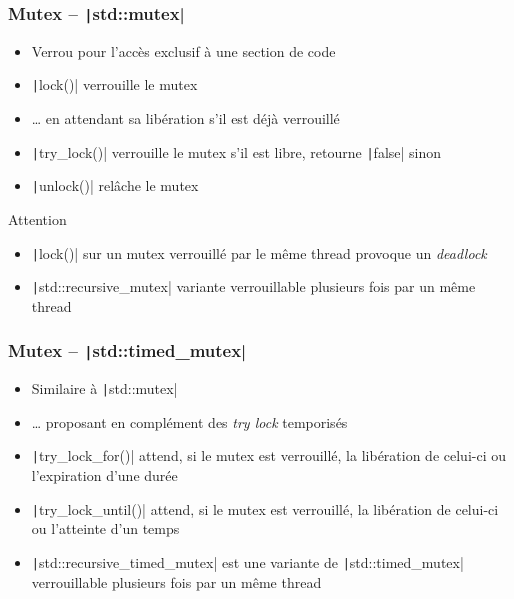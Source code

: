 \documentclass[C++.tex]{subfiles}
\begin{document}
\begin{frame}[fragile]
	\frametitle{Mutex -- \texttt|std::mutex|}
	\begin{itemize}
		\item Verrou pour l'accès exclusif à une section de code
		\item \texttt|lock()| verrouille le mutex 
		\item \ldots{} en attendant sa libération s'il est déjà verrouillé
		\item \texttt|try_lock()| verrouille le mutex s'il est libre, retourne \texttt|false| sinon
		\item \texttt|unlock()| relâche le mutex
	\end{itemize}

	\begin{alertblock}{Attention}
		\begin{itemize}
			\item \texttt|lock()| sur un mutex verrouillé par le même thread provoque un \textit{deadlock}
		\end{itemize}
	\end{alertblock}

	\begin{itemize}
		\item \texttt|std::recursive_mutex| variante verrouillable plusieurs fois par un même thread

	\end{itemize}
\end{frame}

\begin{frame}[fragile]
	\frametitle{Mutex -- \texttt|std::timed_mutex|}
	\begin{itemize}
		\item Similaire à \texttt|std::mutex|
		\item \ldots{} proposant en complément des \textit{try lock} temporisés
		\item \texttt|try_lock_for()| attend, si le mutex est verrouillé, la libération de celui-ci ou l'expiration d'une durée
		\item \texttt|try_lock_until()| attend, si le mutex est verrouillé, la libération de celui-ci ou l'atteinte d'un temps
		\item \texttt|std::recursive_timed_mutex| est une variante de \texttt|std::timed_mutex| verrouillable plusieurs fois par un même thread
	\end{itemize}
\end{frame}
\end{document}
